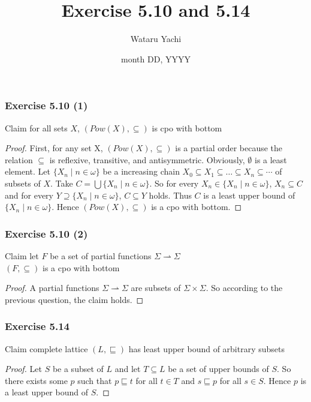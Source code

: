 \documentclass[12pt,aspectratio=169]{beamer}
\title{ Exercise 5.10 and 5.14 }
\author{Wataru Yachi}
\institute{JAIST}
\date{month DD, YYYY}
\begin{document}
\begin{frame}
    \frametitle{Exercise 5.10 (1)}
    \begin{block}{Claim}
        for all sets $X$, $(Pow(X), \subseteq)$ is cpo with bottom
    \end{block}
    \begin{proof}
        First, for any set X, $(Pow(X), \subseteq)$ is a partial order because the relation $\subseteq$ is
        reflexive, transitive, and antisymmetric.
        Obviously, $\emptyset$ is a least element. 
        Let $\{X_n \mid n \in \omega \}$ be a increasing chain
        $X_0 \subseteq X_1 \subseteq \dots \subseteq X_n \subseteq \cdots $ of subsets of $X$.
        Take $C = \bigcup \{X_n \mid n \in \omega \}$.
        So for every $X_n \in \{X_n \mid n \in \omega\}$, $X_n \subseteq C$ and for every $Y \supseteq \{X_n \mid n \in \omega\}$, $C \subseteq Y$ holds.
        Thus $C$ is a least upper bound of $\{X_n \mid n \in \omega \}$.
        Hence $(Pow(X), \subseteq)$ is a cpo with bottom.
    \end{proof}
\end{frame}

\begin{frame}
    \frametitle{Exercise 5.10 (2)}
    \begin{block}{Claim}
        let $F$ be a set of partial functions $\Sigma \rightharpoonup \Sigma$\\
        $(F,\subseteq)$ is a cpo with bottom
    \end{block}
    \begin{proof}
        A partial functions $\Sigma \rightharpoonup \Sigma$ are subsets of $\Sigma \times \Sigma$.
        So according to the previous question, the claim holds.
    \end{proof}
\end{frame}

\begin{frame}
    \frametitle{Exercise 5.14}
    \begin{block}{Claim}
        complete lattice $(L, \sqsubseteq)$ has least upper bound of arbitrary subsets
    \end{block}

    \begin{proof}
        Let $S$ be a subset of $L$ and let $T \subseteq L$ be a set of upper bounds of $S$.
        So there exists some $p$ such that $p \sqsubseteq t$ for all $t \in T$ and $s \sqsubseteq p$ for all $s \in S$.
        Hence $p$ is a least upper bound of $S$.
    \end{proof}
\end{frame}
\end{document}
